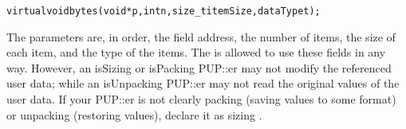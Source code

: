 \begin{alltt}
    virtual void bytes(void *p,int n,size\_t itemSize,dataType t);
\end{alltt}

The parameters are, in order, the field address, the number of items,
the size of each item, and the type of the items. The 
is allowed to use these fields in any way.  However, an isSizing
or isPacking PUP::er may not modify the referenced user data; 
while an isUnpacking PUP::er may not read the original values of 
the user data.  If your PUP::er is not clearly packing (saving values
to some format) or unpacking (restoring values), declare it as 
sizing .




